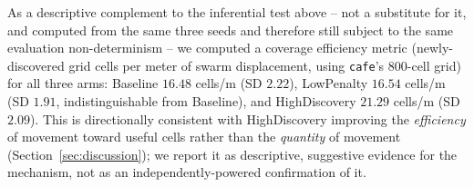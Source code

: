 \documentclass[11pt]{article}
\begin{document}
As a descriptive complement to the inferential test above -- not a
substitute for it, and computed from the same three seeds and therefore
still subject to the same evaluation non-determinism -- we computed a
coverage efficiency metric (newly-discovered grid cells per meter of
swarm displacement, using \texttt{cafe}'s $800$-cell grid) for all three
arms: Baseline $16.48$ cells/m (SD $2.22$), LowPenalty $16.54$ cells/m (SD
$1.91$, indistinguishable from Baseline), and HighDiscovery $21.29$
cells/m (SD $2.09$). This is directionally consistent with HighDiscovery
improving the \emph{efficiency} of movement toward useful cells rather
than the \emph{quantity} of movement (Section~\ref{sec:discussion}); we
report it as descriptive, suggestive evidence for the mechanism, not as
an independently-powered confirmation of it.
\end{document}
